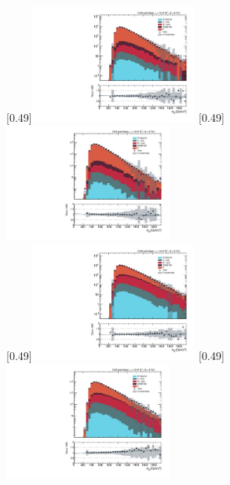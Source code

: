 \begin{figure}[p!] \centering
    [0.49\textwidth]{\includegraphics[width=0.49\textwidth,angle=-90,origin=c]{chapitre8/figs/data_mc/without_shift/2-btag/semimu/mttSelected_btag_sel_reco_fullsel.pdf}} \hfill
    [0.49\textwidth]{\includegraphics[width=0.49\textwidth,angle=-90,origin=c]{chapitre8/figs/data_mc/without_shift/2-btag/semie/mttSelected_btag_sel_reco_fullsel.pdf}} \\ \vspace{5mm}
    [0.49\textwidth]{\includegraphics[width=0.49\textwidth,angle=-90,origin=c]{chapitre8/figs/data_mc/without_shift/1-btag/semimu/mttSelected_btag_sel_reco_fullsel.pdf}} \hfill
    [0.49\textwidth]{\includegraphics[width=0.49\textwidth,angle=-90,origin=c]{chapitre8/figs/data_mc/without_shift/1-btag/semie/mttSelected_btag_sel_reco_fullsel.pdf}}

\end{figure}
